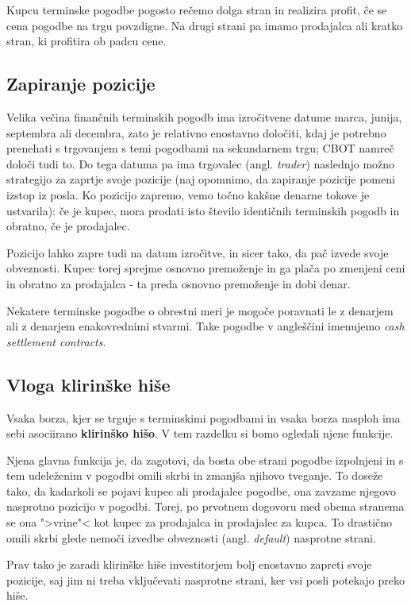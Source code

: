 \documentclass[a4paper, 11pt]{article}
\begin{document}
Kupcu terminske pogodbe pogosto rečemo dolga stran in realizira profit, če se cena pogodbe na 
trgu povzdigne. Na drugi strani pa imamo prodajalca ali kratko stran, ki profitira ob padcu cene.

\subsection{Zapiranje pozicije}
Velika večina finančnih terminskih pogodb ima izročitvene datume marca, junija, septembra ali 
decembra, zato je relativno enostavno določiti, kdaj je potrebno prenehati s trgovanjem s temi 
pogodbami na sekundarnem trgu; CBOT namreč določi tudi to. Do tega datuma pa ima trgovalec 
(angl. \textit{trader}) naslednjo možno strategijo za zaprtje svoje pozicije (naj opomnimo, da 
zapiranje pozicije pomeni izstop iz posla. Ko pozicijo zapremo, vemo točno kakšne denarne 
tokove je ustvarila): če je kupec, mora prodati isto število identičnih terminskih pogodb in 
obratno, če je prodajalec.

Pozicijo lahko zapre tudi na datum izročitve, in sicer tako, da pač izvede svoje obveznosti. 
Kupec torej sprejme osnovno premoženje in ga plača po zmenjeni ceni in obratno za prodajalca - 
ta preda osnovno premoženje in dobi denar. 

Nekatere terminske pogodbe o obrestni meri je mogoče poravnati le z denarjem ali z denarjem 
enakovrednimi stvarmi. Take pogodbe v angleščini imenujemo \textit{cash settlement contracts}.

\subsection{Vloga klirinške hiše}
Vsaka borza, kjer se trguje s terminskimi pogodbami in vsaka borza nasploh ima sebi asociirano 
\textbf{klirinško hišo}. V tem razdelku si bomo ogledali njene funkcije.

Njena glavna funkcija je, da zagotovi, da bosta obe strani pogodbe izpolnjeni in s tem 
udeleženim v pogodbi omili skrbi in zmanjša njihovo tveganje. To doseže tako, da kadarkoli
se pojavi kupec ali prodajalec pogodbe, ona zavzame njegovo nasprotno pozicijo v pogodbi.
Torej, po prvotnem dogovoru med obema stranema se ona ">vrine"< kot kupec za prodajalca in 
prodajalec za kupca. To drastično omili skrbi glede nemoči izvedbe obveznosti (angl. 
\textit{default}) nasprotne strani. 

Prav tako je zaradi klirinške hiše investitorjem bolj enostavno zapreti svoje pozicije, saj 
jim ni treba vključevati nasprotne strani, ker vsi posli potekajo preko hiše. 
\end{document}
